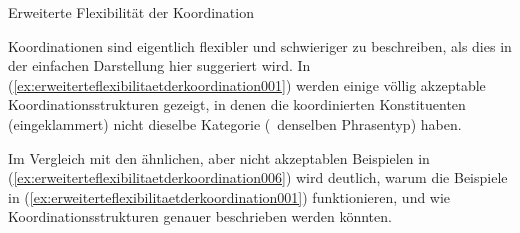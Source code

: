 \begin{Vertiefung}{Erweiterte Flexibilität der Koordination}
\label{vert:erweiterteflexibilitaetderkoordination}

\noindent Koordinationen sind eigentlich flexibler und schwieriger zu beschreiben, als dies in der einfachen Darstellung hier suggeriert wird.
In (\ref{ex:erweiterteflexibilitaetderkoordination001}) werden einige völlig akzeptable Koordinationsstrukturen gezeigt, in denen die koordinierten Konstituenten (eingeklammert) nicht dieselbe Kategorie (\zB\ denselben Phrasentyp) haben.

\begin{exe}
  \ex\label{ex:erweiterteflexibilitaetderkoordination001} 
  \begin{xlist}
    \ex{\label{ex:erweiterteflexibilitaetderkoordination002} <++>}
  \end{xlist}
\end{exe}

Im Vergleich mit den ähnlichen, aber nicht akzeptablen Beispielen in (\ref{ex:erweiterteflexibilitaetderkoordination006}) wird deutlich, warum die Beispiele in (\ref{ex:erweiterteflexibilitaetderkoordination001}) funktionieren, und wie Koordinationsstrukturen genauer beschrieben werden könnten.

\begin{exe}
  \ex\label{ex:erweiterteflexibilitaetderkoordination006} 
  \begin{xlist}
  \end{xlist}
\end{exe}


\end{Vertiefung}
